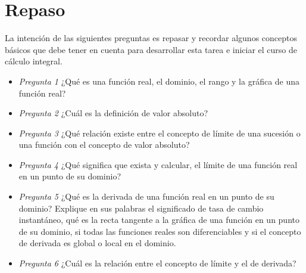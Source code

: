 \section{Repaso}

La intención de las siguientes preguntas es repasar y recordar algunos conceptos básicos que debe tener en cuenta para desarrollar esta tarea e iniciar el curso de cálculo integral.

\begin{itemize}
    \item \textit{Pregunta 1} ¿Qué es una función real, el dominio, el rango y la gráfica de una función real?
    \item \textit{Pregunta 2} ¿Cuál es la definición de valor absoluto?
    \item \textit{Pregunta 3} ¿Qué relación existe entre el concepto de límite de una sucesión o una función con el concepto de valor absoluto?
    \item \textit{Pregunta 4} ¿Qué significa que exista y calcular, el límite de una función real en un punto de su dominio?
    \item \textit{Pregunta 5} ¿Qué es la derivada de una función real en un punto de su dominio? Explique en sus palabras el significado de tasa de cambio instantáneo, qué es la recta tangente a la gráfica de una función en un punto de su dominio, si todas las funciones reales son diferenciables y si el concepto de derivada es global o local en el dominio.
    \item \textit{Pregunta 6} ¿Cuál es la relación entre el concepto de límite y el de derivada?
\end{itemize}